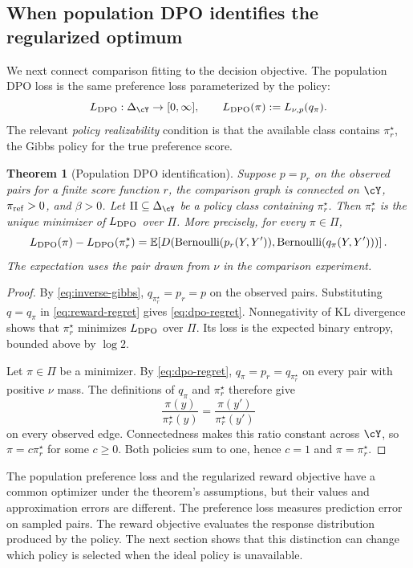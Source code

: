 \documentclass[11pt,twoside]{article}
\newcommand{\E}{\mathbb E}
\newcommand{\KL}{D}
\newtheorem{theorem}{Theorem}[section]
\theoremstyle{definition}
\theoremstyle{remark}
\begin{document}
\subsection{When population DPO identifies the regularized optimum}

We next connect comparison fitting to the decision objective. The
population DPO loss is the same preference loss parameterized by the policy:
\[
 L_{\rm DPO}:\Delta_{\cY}\to[0,\infty],\qquad
 L_{\rm DPO}(\pi):=L_{\nu,p}(q_\pi).
\]
The relevant \emph{policy realizability} condition is that the available class contains
$\pi_r^\star$, the Gibbs policy for the true preference score.

\begin{theorem}[Population DPO identification]
\label{thm:dpo}
Suppose $p=p_r$ on the observed pairs for a finite score function $r$,
the comparison graph is connected on $\cY$, $\pi_{\rm ref}>0$, and
$\beta>0$. Let $\Pi\subseteq\Delta_{\cY}$ be a policy class containing
$\pi_r^\star$. Then $\pi_r^\star$ is the unique minimizer of
$L_{\rm DPO}$ over $\Pi$. More precisely, for every $\pi\in\Pi$,
\begin{equation}
 L_{\rm DPO}(\pi)-L_{\rm DPO}(\pi_r^\star)
 =\E\!\left[\KL\!\left(
 \operatorname{Bernoulli}(p_r(Y,Y')),
 \operatorname{Bernoulli}(q_\pi(Y,Y'))\right)\right].
 \label{eq:dpo-regret}
\end{equation}
The expectation uses the pair drawn from $\nu$ in the comparison experiment.
\end{theorem}

\begin{proof}
By \cref{eq:inverse-gibbs}, $q_{\pi_r^\star}=p_r=p$ on the observed
pairs. Substituting $q=q_\pi$ in \cref{eq:reward-regret} gives
\cref{eq:dpo-regret}. Nonnegativity of KL divergence shows that
$\pi_r^\star$ minimizes $L_{\rm DPO}$ over $\Pi$. Its loss is the
expected binary entropy, bounded above by $\log 2$.

Let $\pi\in\Pi$ be a minimizer. By \cref{eq:dpo-regret},
$q_\pi=p_r=q_{\pi_r^\star}$ on every pair with positive $\nu$ mass.
The definitions of $q_\pi$ and $\pi_r^\star$ therefore give
\[
 \frac{\pi(y)}{\pi_r^\star(y)}
 =\frac{\pi(y')}{\pi_r^\star(y')}
\]
on every observed edge. Connectedness makes this ratio constant across
$\cY$, so $\pi=c\pi_r^\star$ for some $c\ge0$. Both policies sum to
one, hence $c=1$ and $\pi=\pi_r^\star$.
\end{proof}

The population preference loss and the regularized reward objective have
a common optimizer under the theorem's assumptions, but their values and approximation
errors are different. The preference loss measures prediction error on
sampled pairs. The reward objective evaluates the response distribution
produced by the policy. The next section shows that this distinction can
change which policy is selected when the ideal policy is unavailable.
\end{document}
